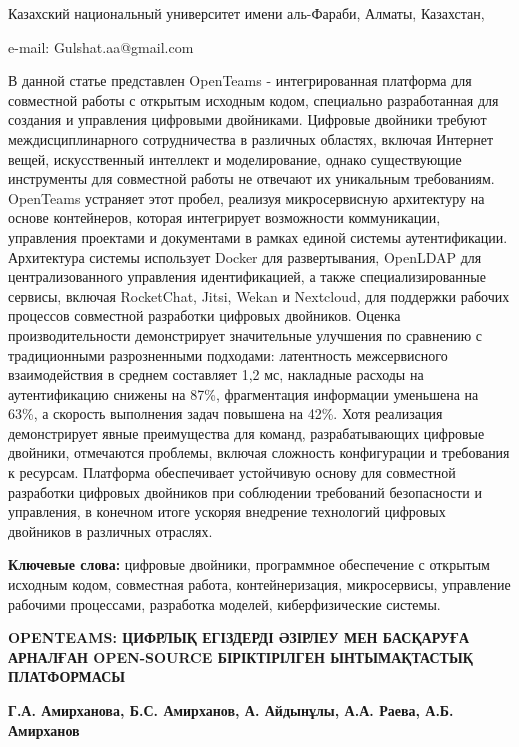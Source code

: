 \begin{affil}
Казахский национальный университет имени аль-Фараби, Алматы, Казахстан,

e-mail: Gulshat.aa@gmail.com
\end{affil}

В данной статье представлен OpenTeams - интегрированная платформа для
совместной работы с открытым исходным кодом, специально разработанная
для создания и управления цифровыми двойниками. Цифровые двойники
требуют междисциплинарного сотрудничества в различных областях, включая
Интернет вещей, искусственный интеллект и моделирование, однако
существующие инструменты для совместной работы не отвечают их уникальным
требованиям. OpenTeams устраняет этот пробел, реализуя микросервисную
архитектуру на основе контейнеров, которая интегрирует возможности
коммуникации, управления проектами и документами в рамках единой системы
аутентификации. Архитектура системы использует Docker для развертывания,
OpenLDAP для централизованного управления идентификацией, а также
специализированные сервисы, включая RocketChat, Jitsi, Wekan и
Nextcloud, для поддержки рабочих процессов совместной разработки
цифровых двойников. Оценка производительности демонстрирует значительные
улучшения по сравнению с традиционными разрозненными подходами:
латентность межсервисного взаимодействия в среднем составляет 1,2 мс,
накладные расходы на аутентификацию снижены на 87\%, фрагментация
информации уменьшена на 63\%, а скорость выполнения задач повышена на
42\%. Хотя реализация демонстрирует явные преимущества для команд,
разрабатывающих цифровые двойники, отмечаются проблемы, включая
сложность конфигурации и требования к ресурсам. Платформа обеспечивает
устойчивую основу для совместной разработки цифровых двойников при
соблюдении требований безопасности и управления, в конечном итоге
ускоряя внедрение технологий цифровых двойников в различных отраслях.

{\bfseries Ключевые слова:} цифровые двойники, программное обеспечение с
открытым исходным кодом, совместная работа, контейнеризация,
микросервисы, управление рабочими процессами, разработка моделей,
киберфизические системы.

\begin{header}
{\bfseries OPENTEAMS: ЦИФРЛЫҚ ЕГІЗДЕРДІ ӘЗІРЛЕУ МЕН БАСҚАРУҒА АРНАЛҒАН OPEN-SOURCE БІРІКТІРІЛГЕН ЫНТЫМАҚТАСТЫҚ ПЛАТФОРМАСЫ}

{\bfseries
Г.А. Амирханова\envelope,
Б.С. Амирханов,
А. Айдынұлы,
А.А. Раева,
А.Б. Амирханов
}
\end{header}


